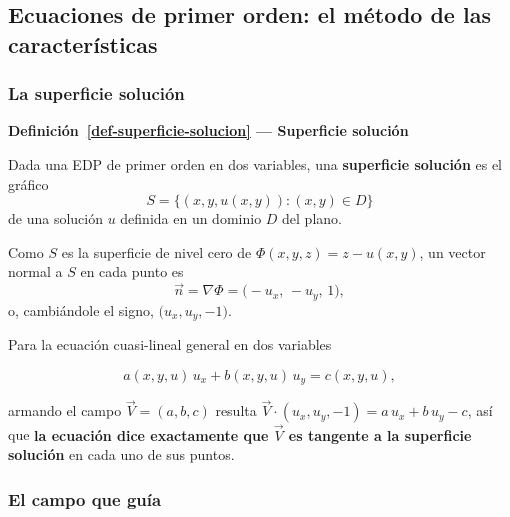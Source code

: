 \documentclass[
  spanish,
  a4paper,
]{scrbook}
\theoremstyle{definition}
\theoremstyle{plain}
\theoremstyle{definition}
\theoremstyle{plain}
\theoremstyle{definition}
\theoremstyle{remark}
\begin{document}
\subsection{Ecuaciones de primer orden: el método de las
características}\label{sec-resumen-4}

\subsubsection{La superficie solución}\label{la-superficie-soluciuxf3n}

\begin{tcolorbox}[enhanced jigsaw, arc=.35mm, bottomrule=.15mm, breakable, colback=white, colframe=quarto-callout-note-color-frame, left=2mm, leftrule=.75mm, opacityback=0, rightrule=.15mm, toprule=.15mm]
\begin{minipage}[t]{5.5mm}
\textcolor{quarto-callout-note-color}{\faInfo}
\end{minipage}%
\begin{minipage}[t]{\textwidth - 5.5mm}

\vspace{-3mm}\textbf{Definición~\ref{def-superficie-solucion} --- Superficie solución}\vspace{3mm}

Dada una EDP de primer orden en dos variables, una \textbf{superficie
solución} es el gráfico \[
S = \{(x,y,u(x,y)) : (x,y) \in D\}
\] de una solución \(u\) definida en un dominio \(D\) del plano.

Como \(S\) es la superficie de nivel cero de
\(\Phi(x,y,z) = z - u(x,y)\), un vector normal a \(S\) en cada punto es
\[
\vec n = \nabla\Phi = \big(-u_x,\, -u_y,\, 1\big),
\] o, cambiándole el signo, \(\big(u_x, u_y, -1\big)\).

\end{minipage}%
\end{tcolorbox}

Para la ecuación cuasi-lineal general en dos variables

\[
a(x,y,u)\,u_x + b(x,y,u)\,u_y = c(x,y,u) ,
\]

armando el campo \(\vec V = (a,b,c)\) resulta
\(\vec V\cdot(u_x,u_y,-1) = a\,u_x + b\,u_y - c\), así que \textbf{la
ecuación dice exactamente que \(\vec V\) es tangente a la superficie
solución} en cada uno de sus puntos.

\subsubsection{El campo que guía}\label{el-campo-que-guuxeda}
\end{document}
